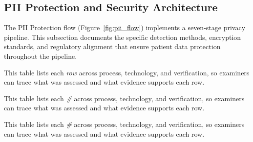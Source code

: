 

\subsection{PII Protection and Security Architecture}
\label{sec:pii_security}

The PII Protection flow (Figure~\ref{fig:pii_flow}) implements a seven-stage privacy pipeline. This subsection documents the specific detection methods, encryption standards, and regulatory alignment that ensure patient data protection throughout the pipeline.


\noindent This table lists each \textit{row} across process, technology, and verification, so examiners can trace what was assessed and what evidence supports each row.



\noindent This table lists each \textit{\#} across process, technology, and verification, so examiners can trace what was assessed and what evidence supports each row.


\noindent This table lists each \textit{\#} across process, technology, and verification, so examiners can trace what was assessed and what evidence supports each row.



